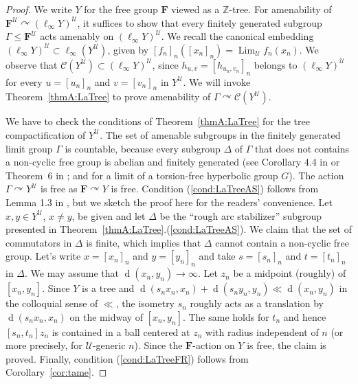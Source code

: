 \documentclass[12pt,nosumlimits,nonamelimits]{amsart}
\theoremstyle{remark}
\theoremstyle{definition}
\newcommand{\IZ}{\mathbb{Z}}
\newcommand{\bF}{\mathbf{F}}
\newcommand{\cC}{\mathcal{C}}
\newcommand{\cU}{\mathcal{U}}
\newcommand{\Ga}{\Gamma}
\newcommand{\acts}{\curvearrowright}
\DeclareMathOperator{\Lim}{Lim}
\DeclareMathOperator{\dist}{d}
\begin{document}
\begin{proof}
We write $Y$ for the free group 
$\bF$ viewed as a $\IZ$-tree. 
For amenability of $\bF^\cU\acts(\ell_\infty Y)^\cU$, 
it suffices to show that every finitely generated subgroup $\Ga \le \bF^\cU$ 
acts amenably on $(\ell_\infty Y)^\cU$.
We recall the canonical embedding 
$(\ell_\infty Y)^\cU\subset \ell_\infty(Y^\cU)$, 
given by $[f_n]_n([x_n]_n) = \Lim_\cU f_n(x_n)$. 
We observe that $\cC(Y^\cU)\subset (\ell_\infty Y)^\cU$, since 
$h_{u,v} = [h_{u_n,v_n}]_n$ belongs to $(\ell_\infty Y)^\cU$ for 
every $u=[u_n]_n$ and $v=[v_n]_n$ in $Y^\cU$. 
We will invoke Theorem~\ref{thmA:LaTree} to prove 
amenability of $\Ga\acts\cC(Y^\cU)$. 

We have to check the conditions of Theorem~\ref{thmA:LaTree} 
for the tree compactification of $Y^\cU$. 
The set of amenable subgroups in the finitely generated limit group $\Ga$ is 
countable, because every subgroup $\Delta$ of $\Ga$ that does not 
contains a non-cyclic free group is abelian and finitely generated 
(see Corollary 4.4 in \cite{sela} or Theorem~6 in \cite{km}; 
and \cite{sela:plms,km2} for a limit of 
a torsion-free hyperbolic group $G$).
The action $\Ga\acts Y^\cU$ is free as $\bF\acts Y$ is free. 
Condition (\ref{cond:LaTreeAS}) follows from Lemma 1.3 in \cite{sela}, 
but we sketch the proof here for the readers' convenience. 
Let $x,y\in Y^\cU$, $x\neq y$, be given and let $\Delta$ be the 
``rough arc stabilizer'' subgroup presented in 
Theorem~\ref{thmA:LaTree}.(\ref{cond:LaTreeAS}). 
We claim that the set of commutators in $\Delta$ is finite, 
which implies that $\Delta$ cannot contain a non-cyclic free group. 
Let's write $x=[x_n]_n$ and $y=[y_n]_n$ and take $s=[s_n]_n$ and $t=[t_n]_n$ in $\Delta$. 
We may assume that $\dist(x_n,y_n)\to\infty$. 
Let $z_n$ be a midpoint (roughly) of $[x_n,y_n]$. 
Since $Y$ is a tree and 
$\dist(s_nx_n,x_n)+\dist(s_ny_n,y_n) \ll \dist(x_n,y_n)$ 
in the colloquial sense of $\ll$, the isometry $s_n$ roughly acts 
as a translation by $\dist(s_nx_n,x_n)$ on the midway of $[x_n,y_n]$. 
The same holds for $t_n$ and hence $[s_n,t_n] z_n$ is contained 
in a ball centered at $z_n$ with radius independent of $n$ 
(or more precisely, for $\cU$-generic $n$). 
Since the $\bF$-action on $Y$ is free, the claim is proved. 
Finally, condition (\ref{cond:LaTreeFR}) follows from 
Corollary~\ref{cor:tame}.
\end{proof}
\end{document}
